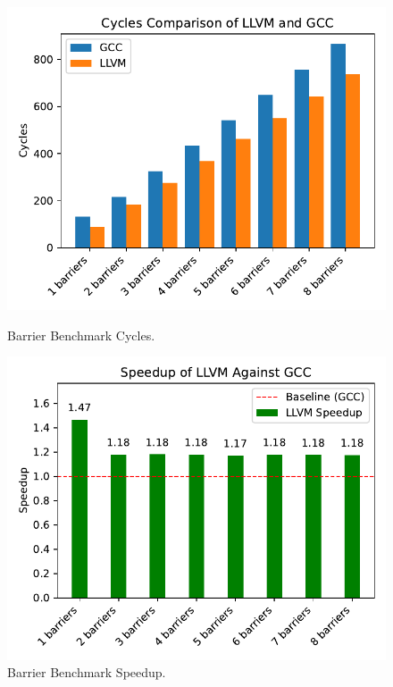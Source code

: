 \begin{figure}[h]
	\centering
	\begin{minipage}{0.49\textwidth}
		\centering
		\includegraphics[width=\linewidth]{./fig/benchmarks/barrier_benchmark_cycles.pdf}
		\caption{Barrier Benchmark Cycles.}%
		\label{fig:barrier-benchmark-cycles}
	\end{minipage}\hfill
	\begin{minipage}{0.49\textwidth}
		\centering
		\includegraphics[width=\linewidth]{./fig/benchmarks/barrier_benchmark_speedup.pdf}
		\caption{Barrier Benchmark Speedup.}%
		\label{fig:barrier-benchmark-speedup}
	\end{minipage}
\end{figure}

